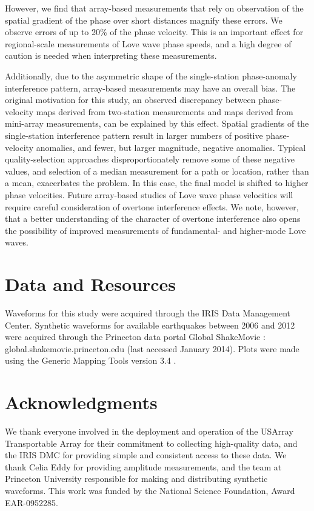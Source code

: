 \documentclass[12pt,oneside]{book}
\begin{document}
However, we find that array-based measurements that rely on observation of the spatial gradient of the phase over short distances magnify these errors. We observe errors of up to 20\% of the phase velocity. This is an important effect for regional-scale measurements of Love wave phase speeds, and a high degree of caution is needed when interpreting these measurements. 

Additionally, due to the asymmetric shape of the single-station phase-anomaly interference pattern, array-based measurements may have an overall bias. The original motivation for this study, an observed discrepancy between phase-velocity maps derived from two-station measurements and maps derived from mini-array measurements, can be explained by this effect. Spatial gradients of the single-station interference pattern result in larger numbers of positive phase-velocity anomalies, and fewer, but larger magnitude, negative anomalies. Typical quality-selection approaches disproportionately remove some of these negative values, and selection of a median measurement for a path or location, rather than a mean, exacerbates the problem. In this case, the final model is shifted to higher phase velocities. Future array-based studies of Love wave phase velocities will require careful consideration of overtone interference effects. We note, however, that a better understanding of the character of overtone interference also opens the possibility of improved measurements of fundamental- and higher-mode Love waves. 

\section*{Data and Resources}
Waveforms for this study were acquired through the IRIS Data Management Center. Synthetic waveforms for available earthquakes between 2006 and 2012 were acquired through the Princeton data portal Global ShakeMovie \citep{Tromp2010}: global.shakemovie.princeton.edu (last accessed January 2014). Plots were made using the Generic Mapping Tools version 3.4 \citep{GMT}.
\section*{Acknowledgments}
We thank everyone involved in the deployment and operation of the USArray Transportable Array for their commitment to collecting high-quality data, and the IRIS DMC for providing simple and consistent access to these data. We thank Celia Eddy for providing amplitude measurements, and the team at Princeton University responsible for making and distributing synthetic waveforms. This work was funded by the National Science Foundation, Award EAR-0952285. 
\end{document}
